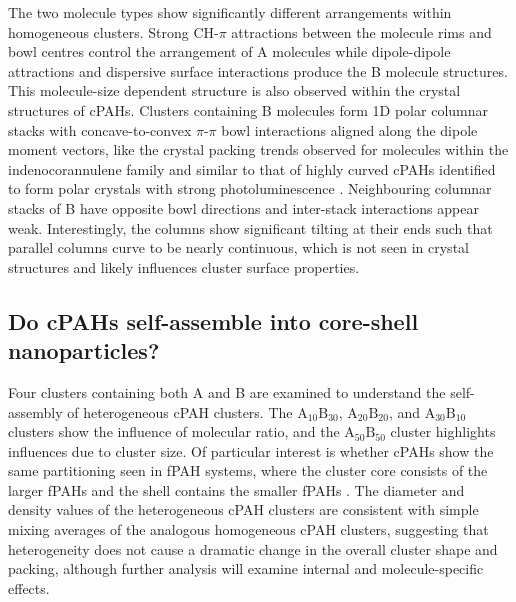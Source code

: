 The two molecule types show significantly different arrangements within homogeneous clusters. Strong CH-$\pi$ attractions between the molecule rims and bowl centres control the arrangement of A molecules while dipole-dipole attractions and dispersive surface interactions produce the B molecule structures. This molecule-size dependent structure is also observed within the crystal structures of cPAHs. Clusters containing B molecules form 1D polar columnar stacks with concave-to-convex $\pi$-$\pi$ bowl interactions aligned along the dipole moment vectors, like the crystal packing trends observed for molecules within the indenocorannulene family \cite{Filatov2010} and similar to that of highly curved cPAHs identified to form polar crystals with strong photoluminescence \cite{chen2014highly}. Neighbouring columnar stacks of B have opposite bowl directions and inter-stack interactions appear weak. Interestingly, the columns show significant tilting at their ends such that parallel columns curve to be nearly continuous, which is not seen in crystal structures and likely influences cluster surface properties.
%


\subsection{Do cPAHs self-assemble into core-shell nanoparticles?} %
Four clusters containing both A and B are examined to understand the self-assembly of heterogeneous cPAH clusters. The $\text{A}_{\text{10}}\text{B}_{\text{30}}$, $\text{A}_{\text{20}}\text{B}_{\text{20}}$, and  $\text{A}_{\text{30}}\text{B}_{\text{10}}$ clusters show the influence of molecular ratio, and the $\text{A}_{\text{50}}\text{B}_{\text{50}}$ cluster highlights influences due to cluster size. Of particular interest is whether cPAHs show the same partitioning seen in fPAH systems, where the cluster core consists of the larger fPAHs and the shell contains the smaller fPAHs \cite{bowal2018partitioning}. The diameter and density values of the heterogeneous cPAH clusters are consistent with simple mixing averages of the analogous homogeneous cPAH clusters, suggesting that heterogeneity does not cause a dramatic change in the overall cluster shape and packing, although further analysis will examine internal and molecule-specific effects.

